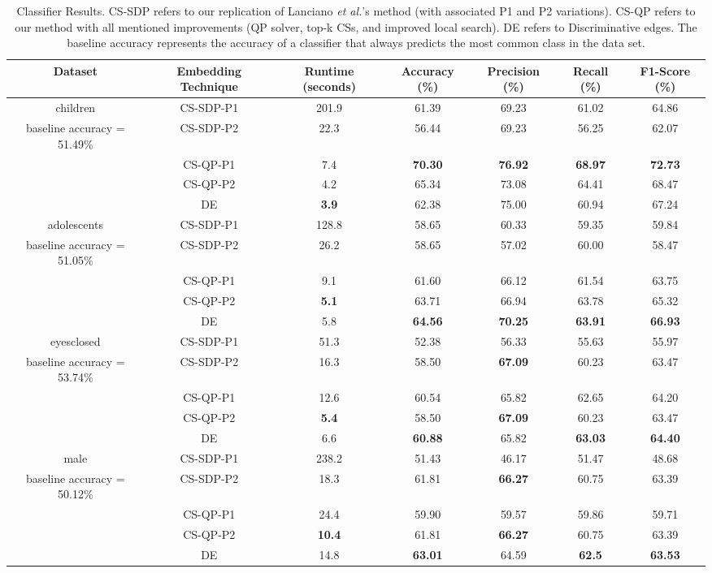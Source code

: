 \documentclass[sigconf]{acmart}
\begin{document}
\begin{table}[t]
    \centering
    \caption{Classifier Results. CS-SDP refers to our replication of Lanciano \emph{et al.}'s method (with associated P1 and P2 variations). CS-QP refers to our method with all mentioned improvements (QP solver, top-k CSs, and improved local search). DE refers to Discriminative edges. The baseline accuracy represents the accuracy of a classifier that always predicts the most common class in the data set.}
    \begin{tabular}{c c c c c c c}
        \hline
        Dataset & Embedding Technique & Runtime (seconds) & Accuracy (\%) & Precision (\%) & Recall (\%) & F1-Score (\%)\\
        \hline
        children & CS-SDP-P1 & 201.9 & 61.39 & 69.23 & 61.02 & 64.86 \\
        baseline accuracy = 51.49\% & CS-SDP-P2 & 22.3 & 56.44 & 69.23 & 56.25 & 62.07 \\
        & CS-QP-P1 & 7.4 & \textbf{70.30} & \textbf{76.92} & \textbf{68.97} & \textbf{72.73} \\
        & CS-QP-P2 & 4.2 & 65.34 & 73.08 & 64.41 & 68.47 \\
        & DE & \textbf{3.9} & 62.38 & 75.00 & 60.94 & 67.24 \\
        \hline
        adolescents & CS-SDP-P1 & 128.8 & 58.65 & 60.33 & 59.35 & 59.84 \\
        baseline accuracy = 51.05\% & CS-SDP-P2 & 26.2 & 58.65 & 57.02 & 60.00 & 58.47 \\
        & CS-QP-P1 & 9.1 & 61.60 & 66.12 & 61.54 & 63.75 \\
        & CS-QP-P2 & \textbf{5.1} & 63.71 & 66.94 & 63.78 & 65.32 \\
        & DE & 5.8 & \textbf{64.56} & \textbf{70.25} & \textbf{63.91} & \textbf{66.93} \\
        \hline
        eyesclosed & CS-SDP-P1 & 51.3 & 52.38 & 56.33 & 55.63 & 55.97 \\
        baseline accuracy = 53.74\% & CS-SDP-P2 & 16.3 & 58.50 & \textbf{67.09} & 60.23 & 63.47 \\
        & CS-QP-P1 & 12.6 & 60.54 & 65.82 & 62.65 & 64.20 \\
        & CS-QP-P2 & \textbf{5.4} & 58.50 & \textbf{67.09} & 60.23 & 63.47 \\
        & DE & 6.6 & \textbf{60.88} & 65.82 & \textbf{63.03} & \textbf{64.40} \\
        \hline
        male & CS-SDP-P1 & 238.2 & 51.43 & 46.17 & 51.47 & 48.68 \\
        baseline accuracy = 50.12\% & CS-SDP-P2 & 18.3 & 61.81 & \textbf{66.27} & 60.75 & 63.39 \\
        & CS-QP-P1 & 24.4 & 59.90 & 59.57 & 59.86 & 59.71 \\
        & CS-QP-P2 & \textbf{10.4} & 61.81 & \textbf{66.27} & 60.75 & 63.39 \\
        & DE & 14.8 & \textbf{63.01} & 64.59 & \textbf{62.5} & \textbf{63.53} \\
        \hline
    \end{tabular}
    \label{tab:results}
\end{table}
\end{document}
